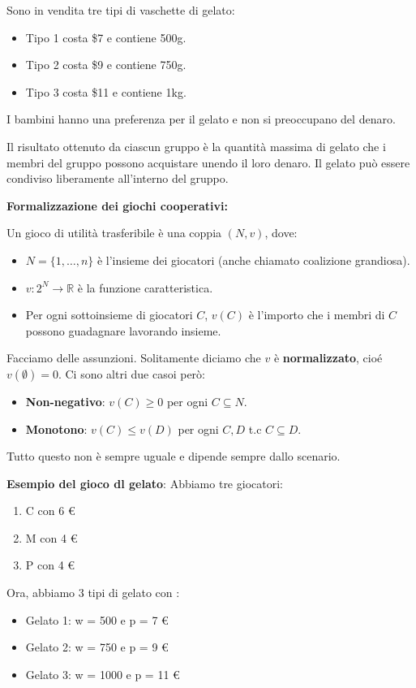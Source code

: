 Sono in vendita tre tipi di vaschette di gelato:
\begin{itemize}
    \item Tipo 1 costa \$7 e contiene 500g.
    \item Tipo 2 costa \$9 e contiene 750g.
    \item Tipo 3 costa \$11 e contiene 1kg.
\end{itemize}

I bambini hanno una preferenza per il gelato e non si preoccupano del denaro.

Il risultato ottenuto da ciascun gruppo è la quantità massima di gelato che i
membri del gruppo possono acquistare unendo il loro denaro. Il gelato può
essere condiviso liberamente all'interno del gruppo.

\textbf{Formalizzazione dei giochi cooperativi:}

Un gioco di utilità trasferibile è una coppia $(N, v)$, dove:
\begin{itemize}
    \item $N = \{1, \ldots, n\}$ è l'insieme dei giocatori (anche chiamato coalizione grandiosa).
    \item $v: 2^N \rightarrow \mathbb{R}$ è la funzione caratteristica.
    \item Per ogni sottoinsieme di giocatori $C$, $v(C)$ è l'importo che i membri di $C$
          possono guadagnare lavorando insieme.
\end{itemize}

Facciamo delle assunzioni. Solitamente diciamo che $v$ è \textbf{normalizzato},
cioé $v(\emptyset) = 0$. Ci sono altri due casoi però:
\begin{itemize}
    \item \textbf{Non-negativo}: $v(C) \geq 0$ per ogni $C \subseteq N$.
    \item \textbf{Monotono}: $v(C) \leq v(D)$ per ogni $C,D$ t.c $C \subseteq D$.
\end{itemize}

Tutto questo non è sempre uguale e dipende sempre dallo scenario.

\textbf{Esempio del gioco dl gelato}: Abbiamo tre giocatori:
\begin{enumerate}
    \item C con 6 $€$
    \item M con 4 $€$
    \item P con 4 $€$
\end{enumerate}

Ora, abbiamo 3 tipi di gelato con :
\begin{itemize}
    \item Gelato 1: w = 500 e p = 7 $€$
    \item Gelato 2: w = 750 e p = 9 $€$
    \item Gelato 3: w = 1000 e p = 11 $€$
\end{itemize}

